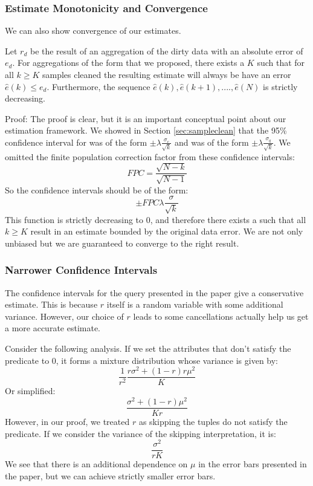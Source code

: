 \subsubsection{Estimate Monotonicity and Convergence}
We can also show convergence of our estimates.
\begin{theorem}
Let $r_{d}$ be the result of an aggregation of the dirty data
with an absolute error of $e_{d}$. For aggregations of the form that
we proposed, there exists a $K$ such that for all $k\ge K$ samples
cleaned the resulting estimate will always be have an error $\hat{e}(k)\le e_{d}$.
Furthermore, the sequence $\hat{e}(k),\hat{e}(k+1),....,\hat{e}(N)$
is strictly decreasing.
\end{theorem}

Proof: The proof is clear, but it is an important conceptual point
about our estimation framework. We showed in Section \ref{sec:sampleclean} that the
95\% confidence interval for \sampleclean was of the form $\pm\lambda\frac{\sigma_{c}}{\sqrt{k}}$
and \bias was of the form $\pm\lambda\frac{\sigma_{q}}{\sqrt{k}}$.
We omitted the finite population correction factor from these confidence intervals:
\[ FPC = \frac{\sqrt{N-k}}{\sqrt{N-1}}\]
So the confidence intervals should be of the form:
\[\pm FPC\lambda\frac{\sigma}{\sqrt{k}} \]
This function is strictly decreasing to 0, and therefore there exists a such that all $k\ge K$ result in an estimate bounded by the original data error.
We are not only unbiased but we are guaranteed to converge to the right result.

\subsubsection{Narrower Confidence Intervals}
The confidence intervals for the \avgfunc query presented in the paper give a conservative estimate.
This is because $r$ itself is a random variable with some additional variance.
However, our choice of $r$ leads to some cancellations actually help us get a more accurate estimate.

Consider the following analysis.
If we set the attributes that don't satisfy the predicate to $0$, it forms a mixture distribution whose variance is given by:
\[ \frac{1}{r^2}\frac{r\sigma^2+(1-r)r\mu^2}{K} \]
Or simplified:
\[\frac{\sigma^2+(1-r)\mu^2}{Kr} \]
However, in our proof, we treated $r$ as skipping the tuples do not satisfy the predicate.
If we consider the variance of the skipping interpretation, it is:
\[ \frac{\sigma^2}{rK}\]
We see that there is an additional dependence on $\mu$ in the error bars presented in the paper, but we can achieve strictly smaller error bars.

